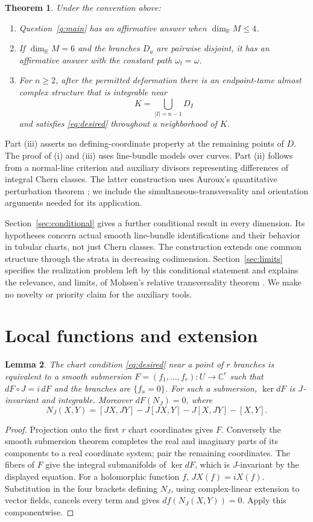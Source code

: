 \documentclass[11pt]{article}
\newtheorem{theorem}{Theorem}[section]
\newtheorem{lemma}[theorem]{Lemma}
\theoremstyle{definition}
\theoremstyle{remark}
\newcommand{\C}{\mathbb C}
\newcommand{\R}{\mathbb R}
\begin{document}
\begin{theorem}\label{thm:partial}
Under the convention above:
\begin{enumerate}[label=(\roman*),leftmargin=*]
\item Question~\ref{q:main} has an affirmative answer when $\dim_\R M\leq4$.
\item If $\dim_\R M=6$ and the branches $D_a$ are pairwise disjoint, it has an affirmative answer with the constant path $\omega_t=\omega$.
\item For $n\geq2$, after the permitted deformation there is an endpoint-tame almost complex structure that is integrable near
\[
 K=\bigcup_{|I|=n-1}D_I
\]
and satisfies \eqref{eq:desired} throughout a neighborhood of $K$.
\end{enumerate}
\end{theorem}
Part (iii) asserts no defining-coordinate property at the remaining points of $D$. The proof of (i) and (iii) uses line-bundle models over curves. Part (ii) follows from a normal-line criterion and auxiliary divisors representing differences of integral Chern classes. The latter construction uses Auroux's quantitative perturbation theorem \cite[Theorem 2]{Auroux}; we include the simultaneous-transversality and orientation arguments needed for its application.

Section~\ref{sec:conditional} gives a further conditional result in every dimension. Its hypotheses concern actual smooth line-bundle identifications and their behavior in tubular charts, not just Chern classes. The construction extends one common structure through the strata in decreasing codimension. Section~\ref{sec:limits} specifies the realization problem left by this conditional statement and explains the relevance, and limits, of Mohsen's relative transversality theorem \cite[p.~657]{Mohsen}. We make no novelty or priority claim for the auxiliary tools.

\section{Local functions and extension}\label{sec:local}

\begin{lemma}\label{lem:submersion}
The chart condition \eqref{eq:desired} near a point of $r$ branches is equivalent to a smooth submersion $F=(f_1,\ldots,f_r):U\to\C^r$ such that $dF\circ J=i\,dF$ and the branches are $\{f_a=0\}$. For such a submersion, $\ker dF$ is $J$-invariant and integrable. Moreover $dF(N_J)=0$, where
\[
 N_J(X,Y)=[JX,JY]-J[JX,Y]-J[X,JY]-[X,Y].
\]
\end{lemma}
\begin{proof}
Projection onto the first $r$ chart coordinates gives $F$. Conversely the smooth submersion theorem completes the real and imaginary parts of its components to a real coordinate system; pair the remaining coordinates. The fibers of $F$ give the integral submanifolds of $\ker dF$, which is $J$-invariant by the displayed equation.
For a holomorphic function $f$, $JX(f)=iX(f)$. Substitution in the four brackets defining $N_J$, using complex-linear extension to vector fields, cancels every term and gives $df(N_J(X,Y))=0$. Apply this componentwise.
\end{proof}
\end{document}
